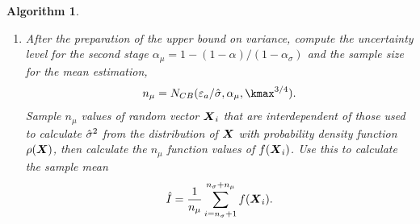 \documentclass{iitthesis}
\newtheorem{algorithm}[theorem]{Algorithm}
\begin{document}
\begin{algorithm}
\begin{enumerate}
\item After the preparation of the upper bound on variance, compute the uncertainty level for the second stage $\alpha_\mu = 1-(1-\alpha)/(1-\alpha_{\sigma})$ and the sample size for the mean estimation,
\begin{align}\label{NCBmeanMCabs}
n_\mu = N_{CB} (\varepsilon_a/\hsigma,\alpha_\mu, \kmax^{3/4}).
\end{align}
Sample $n_\mu$ values of random vector $\boldsymbol{X}_i$ that are interdependent of those used to calculate $\hat{\sigma}^2$ from the distribution of $\boldsymbol{X}$ with probability density function $\rho(\boldsymbol{X})$, then calculate the $n_\mu$ function values of $f(\boldsymbol{X}_i)$. Use this to calculate the sample mean 
\begin{align}\label{hmun}
\hat{I}= \frac{1}{n_\mu}\sum_{i = n_\sigma+1}^{n_\sigma+n_\mu}f(\boldsymbol{X}_i).
\end{align}
\end{enumerate}
\end{algorithm}

\end{document}
